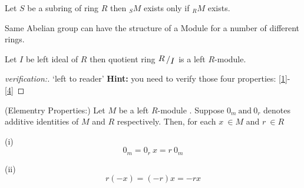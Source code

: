 \begin{remark}
	Let $S$ be a subring of ring $R$ then $_{S}M$ exists   only if $_{R}M$ exists.
\end{remark} \bigskip 
\begin{remark}
	Same Abelian group can have the structure of a Module for a number of different rings. 
\end{remark} \bigskip 
\begin{remark}
Let $I$ be left ideal of $R$ then quotient ring $\bigslant{R}{I}$ is a left $R$-module. 

\end{remark} 
\begin{proof}[verification:]
	`left to reader'\newline \bigskip
	\textbf{Hint:} you need to verify those four properties: \eqref{1}-\eqref{4}
\end{proof}
\bigskip
\begin{theorem}{(Elementry Properties:)}\newline
	Let $M$ be a left $R$-module . Suppose $0_m \ \text{and} \ 0_r$ denotes additive identities of $M$ and $R$ respectively. Then,  for each $x \ \in M$ and $r \ \in R$ \newline
\begin{description}
\item (i)
	\begin{equation*}
	0_m = 0_r\ x = r\ 0_m
	\end{equation*}
\item (ii)
	\begin{equation*}
	r(-x) =  (-r)x = -rx 
	\end{equation*}
\end{description}
\end{theorem}
